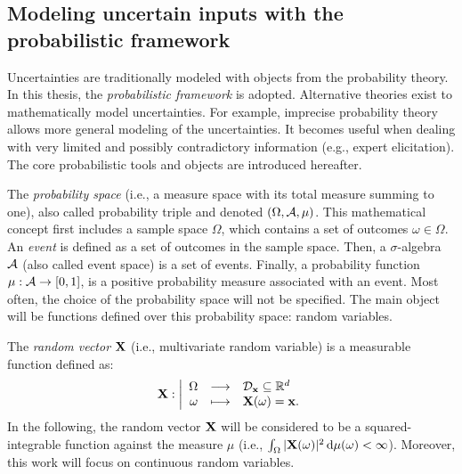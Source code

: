 \subsection{Modeling uncertain inputs with the probabilistic framework}

Uncertainties are traditionally modeled with objects from the probability theory.
In this thesis, the \textit{probabilistic framework} is adopted. 
Alternative theories exist to mathematically model uncertainties. 
For example, imprecise probability theory allows more general modeling of the uncertainties. 
It becomes useful when dealing with very limited and possibly contradictory information (e.g., expert elicitation). 
The core probabilistic tools and objects are introduced hereafter. 

The \textit{probability space} (i.e., a measure space with its total measure summing to one), also called probability triple and denoted $(\Omega, \mathcal{A}, \mu)$.
This mathematical concept first includes a sample space $\Omega$, which contains a set of outcomes $\omega \in \Omega$. 
An \textit{event} is defined as a set of outcomes in the sample space.
Then, a $\sigma$-algebra $\mathcal{A}$ (also called event space) is a set of events. 
Finally, a probability function $\mu: \mathcal{A} \rightarrow [0, 1]$, is a positive probability measure associated with an event.
Most often, the choice of the probability space will not be specified. 
The main object will be functions defined over this probability space: random variables. 

The \textit{random vector} ${\bf X}$ (i.e., multivariate random variable) is a measurable function defined as: 
\begin{equation}
{\bf X} : \bigg|
\begin{array}{rcl}
    \Omega & \longrightarrow & \mathcal{D}_{{\bf x}} \subseteq \mathbb{R}^d\\
    \omega & \longmapsto & {\bf X}(\omega) = {\bf x}.
\end{array}
\end{equation}
In the following, the random vector ${\bf X}$ will be considered to be a squared-integrable function against the measure $\mu$ (i.e., $\int_{\Omega} |{\bf X}(\omega)|^2 \,\mathrm{d} \mu(\omega) < \infty$).
Moreover, this work will focus on continuous random variables.


